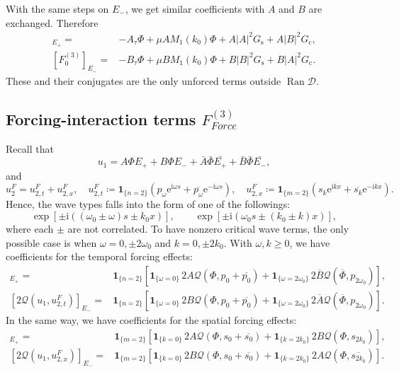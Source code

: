 \documentclass[11pt]{article}
\newcommand{\ii}{\mathrm{i}}
\newcommand{\ee}{\mathrm{e}}
\newcommand{\cQ}{\mathcal{Q}}
\newcommand{\cD}{\mathcal{D}}
\newcommand{\one}[1]{\bm{1}_{\{#1\}}}
\begin{document}
With the same steps on $E_-$, we get similar coefficients with $A$ and $B$ are exchanged.
Therefore
\begin{align}
 [F_{0}^{(3)}]_{E_+}
 =&-A_\tau\Phi+\mu A M_1(k_0)\Phi
 +A|A|^2G_{\mathrm{s}}+A|B|^2G_{\mathrm{c}},\\
 [F_{0}^{(3)}]_{E_-}
 =&-B_\tau\Phi+\mu B M_1(k_0)\Phi
 +B|B|^2G_{\mathrm{s}}+B|A|^2G_{\mathrm{c}}.
 \label{unforced-critical-coefficients}
\end{align}
These and their conjugates are the only unforced terms outside $\operatorname{Ran}\cD$.



\subsection{Forcing-interaction terms $F_{Force}^{(3)}$}
Recall that 
\[
 u_1=A\Phi E_+ +B\Phi E_-+\bar{A}\bar{\Phi} \bar{E_+} +\bar{B}\bar{\Phi} \bar{E_-},
\]
and 
\[
 u_2^F=u_{2,t}^{F} + u_{2,x}^{F},
 \quad u_{2,t}^{F}\coloneqq \one{n=2}\left(
 p_\omega\ee^{\ii\omega s}+\overline{p_\omega}\ee^{-\ii\omega s}\right),
 \quad u_{2,x}^{F}\coloneqq \one{m=2}\left(
 s_k\ee^{\ii kx}+\overline{s_k}\ee^{-\ii kx}\right).
\]
Hence, the wave types falls into the form of one of the followings:
\[
\exp\left[\pm \ii ( ( \omega_0 \pm \omega )s \pm k_0 x)\right],\qquad \exp\left[\pm \ii ( \omega_0 s \pm ( k_0\pm k) x)\right],
\]
where each $\pm$ are not correlated. To have nonzero critical wave terms, the only possible case is when $\omega = 0, \pm 2\omega_0$ and $k=0,\pm 2k_0$. With $\omega, k \geq 0$, we have coefficients for the temporal forcing effects:
\begin{align}
 [2\cQ(u_1,u_{2,t}^F)]_{E_+}
 ={}&\one{n=2}\left[
 \one{\omega=0}\,2A\cQ(\Phi,p_0+\overline{p_0})
 +\one{\omega=2\omega_0}\,2\overline B
 \cQ(\overline\Phi,p_{2\omega_0})\right],
 \label{eq:temporal-critical-A}\\
 [2\cQ(u_1,u_{2,t}^F)]_{E_-}
 ={}&\one{n=2}\left[
 \one{\omega=0}\,2B\cQ(\Phi,p_0+\overline{p_0})
 +\one{\omega=2\omega_0}\,2\overline A
 \cQ(\overline\Phi,p_{2\omega_0})\right].
 \label{eq:temporal-critical-B}
\end{align}
In the same way, we have coefficients for the spatial forcing effects:
\begin{align}
 [2\cQ(u_1,u_{2,x}^F)]_{E_+}
 ={}&\one{m=2}\left[
 \one{k=0}\,2A\cQ(\Phi,s_0+\overline{s_0})
 +\one{k=2k_0}\,2B\cQ(\Phi,s_{2k_0})\right],
 \label{eq:spatial-critical-A}\\
 [2\cQ(u_1,u_{2,x}^F)]_{E_-}
 ={}&\one{m=2}\left[
 \one{k=0}\,2B\cQ(\Phi,s_0+\overline{s_0})
 +\one{k=2k_0}\,2A\cQ(\Phi,\overline{s_{2k_0}})\right].
 \label{eq:spatial-critical-B}
\end{align}
\end{document}
